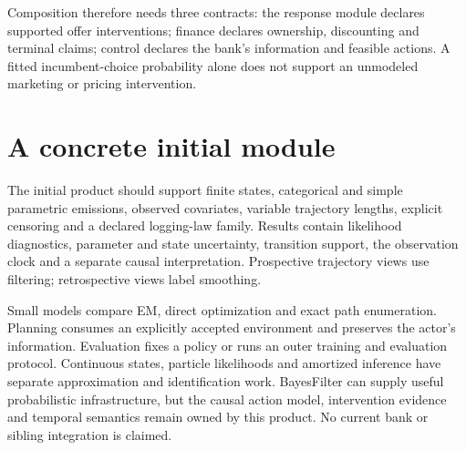 Composition therefore needs three contracts: the response module declares
supported offer interventions; finance declares ownership, discounting
and terminal claims; control declares the bank's information and feasible
actions. A fitted incumbent-choice probability alone does not support an
unmodeled marketing or pricing intervention.

\section{A concrete initial module}
The initial product should support finite states, categorical and simple
parametric emissions, observed covariates, variable trajectory lengths,
explicit censoring and a declared logging-law family. Results contain
likelihood diagnostics, parameter and state uncertainty, transition support,
the observation clock and a separate causal interpretation. Prospective
trajectory views use filtering; retrospective views label smoothing.

Small models compare EM, direct optimization and exact path enumeration.
Planning consumes an explicitly accepted environment and preserves the
actor's information. Evaluation fixes a policy or runs an outer training
and evaluation protocol. Continuous states, particle likelihoods and
amortized inference have separate approximation and identification work.
BayesFilter can supply useful probabilistic infrastructure, but the causal
action model, intervention evidence and temporal semantics remain owned by
this product. No current bank or sibling integration is claimed.

